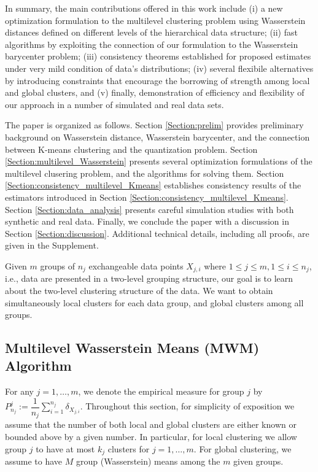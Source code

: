 In summary, the main contributions offered in this work include (i) 
a new optimization formulation to the multilevel clustering problem using Wasserstein
distances defined on different levels of the hierarchical data structure; (ii) 
fast algorithms by exploiting the connection of our formulation to the Wasserstein 
barycenter problem; (iii) consistency theorems established for proposed
estimates under very mild condition of data's distributions; 
(iv) several flexibile alternatives by introducing constraints that encourage the borrowing
of strength among local and global clusters, and (v) finally, demonstration of 
efficiency and flexibility of our approach in a number of simulated and real data sets.  

The paper is organized as follows. Section \ref{Section:prelim} provides preliminary 
background on Wasserstein distance, Wasserstein barycenter, and the connection between 
K-means clustering and the quantization problem. Section 
\ref{Section:multilevel_Wasserstein} presents
several optimization formulations of the multilevel clusering problem, and the algorithms
for solving them. Section
\ref{Section:consistency_multilevel_Kmeans} establishes consistency results of the estimators
introduced in Section \ref{Section:consistency_multilevel_Kmeans}. Section 
\ref{Section:data_analysis} presents careful simulation studies with both synthetic and real 
data. Finally, we conclude the paper with a discussion in Section \ref{Section:discussion}.
Additional technical details, including all proofs, are given in the Supplement.

Given $m$ groups of $n_{j}$ exchangeable data points $X_{j,i}$ where $1 
\leq j \leq m, 1 \leq i \leq n_{j}$, i.e., data are presented in a two-level grouping structure, 
our goal is to learn about the two-level clustering structure of the data. We want
to obtain simultaneously local clusters for each data group, and global clusters among all groups. 

\subsection{Multilevel Wasserstein Means (MWM) Algorithm} \label{Section:multilevel_kmeans}
For any $j=1,\ldots, m$, we denote the empirical measure for group $j$ by $P_{n_{j}}
^{j}:=\dfrac{1}{n_{j}}\sum \limits_{i=1}^{n_{j}}{\delta_{X_{j,i}}}$. Throughout 
this section, for simplicity of exposition we assume that the number of 
both local and global clusters are either known or bounded above by a given number. In 
particular, for local clustering we allow group $j$ to have at most $k_{j}$ clusters 
for $j=1,\ldots, m$. For global clustering, we assume to have $M$ group (Wasserstein) means
among the $m$ given groups.

